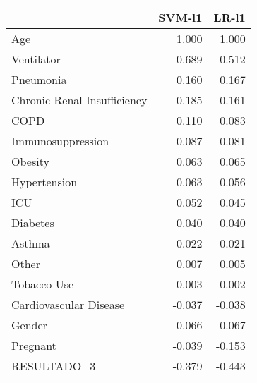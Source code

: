 \begin{tabular}{lrr}
\toprule
{} &  SVM-l1 &  LR-l1 \\
\midrule
Age                         &   1.000 &  1.000 \\
Ventilator                  &   0.689 &  0.512 \\
Pneumonia                   &   0.160 &  0.167 \\
Chronic Renal Insufficiency &   0.185 &  0.161 \\
COPD                        &   0.110 &  0.083 \\
Immunosuppression           &   0.087 &  0.081 \\
Obesity                     &   0.063 &  0.065 \\
Hypertension                &   0.063 &  0.056 \\
ICU                         &   0.052 &  0.045 \\
Diabetes                    &   0.040 &  0.040 \\
Asthma                      &   0.022 &  0.021 \\
Other                       &   0.007 &  0.005 \\
Tobacco Use                 &  -0.003 & -0.002 \\
Cardiovascular Disease      &  -0.037 & -0.038 \\
Gender                      &  -0.066 & -0.067 \\
Pregnant                    &  -0.039 & -0.153 \\
RESULTADO\_3                 &  -0.379 & -0.443 \\
\bottomrule
\end{tabular}

